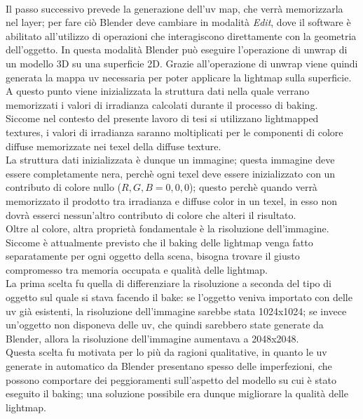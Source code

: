 \\ 
Il passo successivo prevede la generazione dell’uv map, che verrà  memorizzarla nel layer; per fare ciò Blender deve cambiare in modalità \emph{Edit}, dove il software è abilitato all’utilizzo di operazioni che interagiscono direttamente con la geometria dell’oggetto. In questa modalità Blender può eseguire l’operazione di unwrap di un modello 3D su una superficie 2D. Grazie all’operazione di unwrap viene quindi generata la mappa uv necessaria per poter applicare la lightmap sulla superficie. 
\\
A questo punto viene inizializzata la struttura dati nella quale verrano memorizzati i valori di irradianza calcolati durante il processo di baking.
\\
Siccome nel contesto del presente lavoro di tesi si utilizzano lightmapped textures, i valori di irradianza saranno moltiplicati per le componenti di colore diffuse memorizzate nei texel della diffuse texture. 
\\
La struttura dati inizializzata è dunque un immagine; questa immagine deve essere completamente nera, perchè ogni texel deve essere inizializzato con un contributo di colore nullo ($R,G,B = 0,0,0$); questo perchè quando verrà memorizzato il prodotto tra irradianza e diffuse color in un texel, in esso non dovrà esserci nessun’altro contributo di colore che alteri il risultato.
\\
Oltre al colore, altra proprietà fondamentale è la risoluzione dell’immagine.
\\
Siccome è attualmente previsto che il baking delle lightmap venga fatto separatamente per ogni oggetto della scena, bisogna trovare il giusto compromesso tra memoria occupata e qualità delle lightmap. 
\\
La prima scelta fu quella di differenziare la risoluzione a seconda del tipo di oggetto sul quale si stava facendo il bake: se l’oggetto veniva importato con delle uv già esistenti, la risoluzione dell’immagine sarebbe stata 1024x1024; se invece un’oggetto non disponeva delle uv, che quindi sarebbero state generate da Blender, allora la risoluzione dell’immagine aumentava a 2048x2048.
\\
Questa scelta fu motivata per lo più da ragioni qualitative, in quanto le uv generate in automatico da Blender presentano spesso delle imperfezioni, che possono comportare dei peggioramenti sull’aspetto del modello su cui è stato eseguito il baking; una soluzione possibile era dunque migliorare la qualità delle lightmap. 
\\
